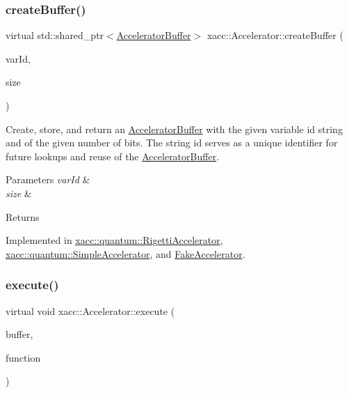 \subsubsection{\texorpdfstring{create\+Buffer()}{createBuffer()}\hspace{0.1cm}{\footnotesize\ttfamily [2/2]}}
{\footnotesize\ttfamily virtual std\+::shared\+\_\+ptr$<$\hyperlink{a02444}{Accelerator\+Buffer}$>$ xacc\+::\+Accelerator\+::create\+Buffer (\begin{DoxyParamCaption}\item[{const std\+::string \&}]{var\+Id,  }\item[{const int}]{size }\end{DoxyParamCaption})\hspace{0.3cm}{\ttfamily [pure virtual]}}

Create, store, and return an \hyperlink{a02444}{Accelerator\+Buffer} with the given variable id string and of the given number of bits. The string id serves as a unique identifier for future lookups and reuse of the \hyperlink{a02444}{Accelerator\+Buffer}.


\begin{DoxyParams}{Parameters}
{\em var\+Id} & \\
\hline
{\em size} & \\
\hline
\end{DoxyParams}
\begin{DoxyReturn}{Returns}

\end{DoxyReturn}


Implemented in \hyperlink{a01212_a731551c94b1abef40d2cf032e8712df6}{xacc\+::quantum\+::\+Rigetti\+Accelerator}, \hyperlink{a01244_adb9393692e9f484df241aa5d014030d1}{xacc\+::quantum\+::\+Simple\+Accelerator}, and \hyperlink{a02496_a09f29b893338dfb0a56dd183cf6949fe}{Fake\+Accelerator}.

\mbox{\label{a02432_a89b3f3e6294f228abf03a410b0fb1674}} 
\subsubsection{\texorpdfstring{execute()}{execute()}}
{\footnotesize\ttfamily virtual void xacc\+::\+Accelerator\+::execute (\begin{DoxyParamCaption}\item[{std\+::shared\+\_\+ptr$<$ \hyperlink{a02444}{Accelerator\+Buffer} $>$}]{buffer,  }\item[{const std\+::shared\+\_\+ptr$<$ \hyperlink{a02456}{Function} $>$}]{function }\end{DoxyParamCaption})\hspace{0.3cm}{\ttfamily [pure virtual]}}

